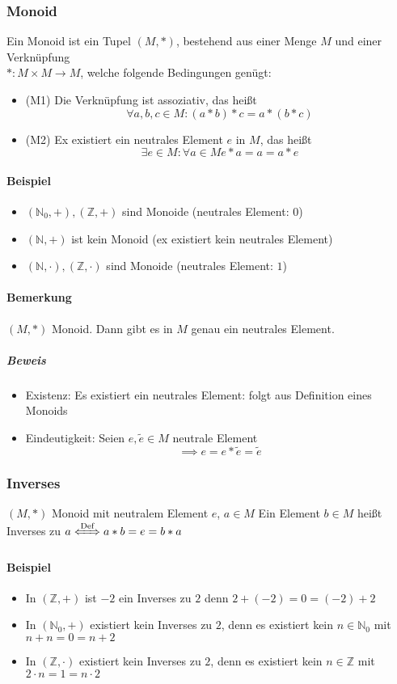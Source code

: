 \documentclass[a4paper]{scrartcl}
\DeclareMathOperator{\Forall}{\forall}
\theoremstyle{definition}
\theoremstyle{plain}
\theoremstyle{plain}
\theoremstyle{remark}
\theoremstyle{remark}
\theoremstyle{remark}
\theoremstyle{remark}
\theoremstyle{remark}
\begin{document}
\subsubsection{Monoid}
\label{sec-3-1-2}
Ein Monoid ist ein Tupel $(M,*)$, bestehend aus einer Menge $M$ und einer Verknüpfung \\
        $*:M\times M \to M$, welche folgende Bedingungen genügt:
\begin{itemize}
\item (M1) Die Verknüpfung ist assoziativ, das heißt \[\Forall a,b,c\in M:(a*b)*c = a*(b*c) \]
\item (M2) Ex existiert ein neutrales Element $e$ in $M$, das heißt \[\exists e\in M:\Forall a\in M e*a = a = a*e\]
\end{itemize}
\paragraph{Beispiel}
\label{sec-3-1-2-1}
\begin{itemize}
\item $(\mathbb{N}_0,+), (\mathbb{Z},+)$ sind Monoide (neutrales Element: $0$)
\item $(\mathbb{N},+)$ ist kein Monoid (ex existiert kein neutrales Element)
\item $(\mathbb{N},\cdot),(\mathbb{Z},\cdot)$ sind Monoide (neutrales Element: $1$)
\end{itemize}
\paragraph{Bemerkung}
\label{sec-3-1-2-2}
$(M,*)$ Monoid. Dann gibt es in $M$ genau ein neutrales Element.
\subparagraph{Beweis}
\label{sec-3-1-2-2-1}
\begin{itemize}
\item Existenz: Es existiert ein neutrales Element: folgt aus Definition eines Monoids
\item Eindeutigkeit: Seien $e,\tilde e \in M$ neutrale Element \[\implies e = e * \tilde e = \tilde e\]
\end{itemize}
\subsubsection{Inverses}
\label{sec-3-1-3}
$(M,*)$ Monoid mit neutralem Element $e$, $a\in M$
Ein Element $b\in M$ heißt Inverses zu $a \xLeftrightarrow{\text{Def}} a * b = e = b * a$
\paragraph{Beispiel}
\label{sec-3-1-3-1}
\begin{itemize}
\item In $(\mathbb{Z},+)$ ist $-2$ ein Inverses zu $2$ denn $2 + (-2) = 0 = (-2) + 2$
\item In $(\mathbb{N}_0,+)$ existiert kein Inverses zu $2$, denn es existiert kein $n\in \mathbb{N}_0$ mit $n + n = 0 = n + 2$
\item \label{invex} In $(\mathbb{Z},\cdot)$ existiert kein Inverses zu $2$, denn es existiert kein $n\in\mathbb{Z}$ mit $2\cdot n = 1 = n \cdot 2$
\end{itemize}
\end{document}
